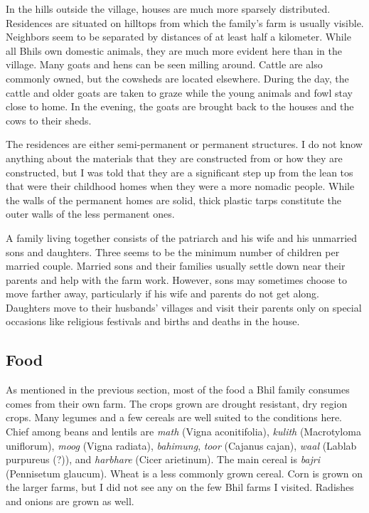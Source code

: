 \documentclass[report.tex]{subfiles}
\begin{document}
In the hills outside the village, houses are much more sparsely distributed. Residences are situated on hilltops from which the family's farm is usually visible. Neighbors seem to be separated by distances of at least half a kilometer. While all Bhils own domestic animals, they are much more evident here than in the village. Many goats and hens can be seen milling around. Cattle are also commonly owned, but the cowsheds are located elsewhere. During the day, the cattle and older goats are taken to graze while the young animals and fowl stay close to home. In the evening, the goats are brought back to the houses and the cows to their sheds.

The residences are either semi-permanent or permanent structures. I do not know anything about the materials that they are constructed from or how they are constructed, but I was told that they are a significant step up from the lean tos that were their childhood homes when they were a more nomadic people. While the walls of the permanent homes are solid, thick plastic tarps constitute the outer walls of the less permanent ones.

A family living together consists of the patriarch and his wife and his unmarried sons and daughters. Three seems to be the minimum number of children per married couple. Married sons and their families usually settle down near their parents and help with the farm work. However, sons may sometimes choose to move farther away, particularly if his wife and parents do not get along. Daughters move to their husbands' villages and visit their parents only on special occasions like religious festivals and births and deaths in the house.

\subsection{Food}\label{subsec:food}

As mentioned in the previous section, most of the food a Bhil family consumes comes from their own farm. The crops grown are drought resistant, dry region crops. Many legumes and a few cereals are well suited to the conditions here. Chief among beans and lentils are \textit{math} (Vigna aconitifolia), \textit{kulith} (Macrotyloma uniflorum), \textit{moog} (Vigna radiata), \textit{bahimung}, \textit{toor} (Cajanus cajan), \textit{waal} (Lablab purpureus (?)), and \textit{harbhare} (Cicer arietinum). The main cereal is \textit{bajri} (Pennisetum glaucum). Wheat is a less commonly grown cereal. Corn is grown on the larger farms, but I did not see any on the few Bhil farms I visited. Radishes and onions are grown as well.
\end{document}
